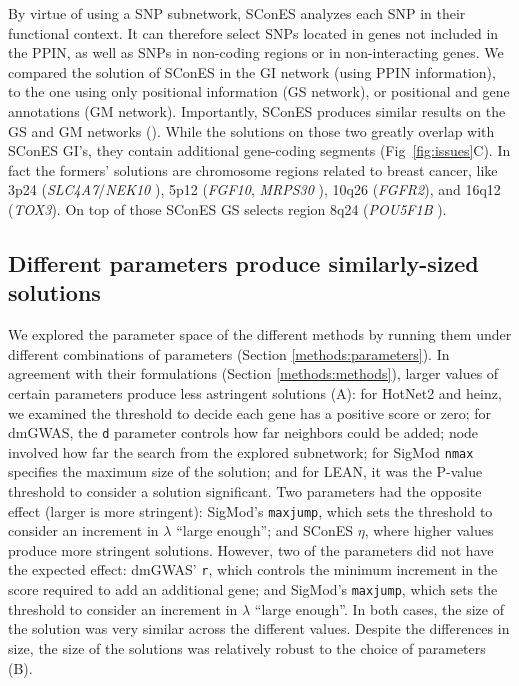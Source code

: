 \documentclass[10pt,letterpaper]{article}
\begin{document}
By virtue of using a SNP subnetwork, SConES analyzes each SNP in their functional context. It can therefore select SNPs located in genes not included in the PPIN, as well as SNPs in non-coding regions or in non-interacting genes. We compared the solution of SConES in the GI network (using PPIN information), to the one using only positional information (GS network), or positional and gene annotations (GM network). Importantly, SConES produces similar results on the GS and GM networks (). While the solutions on those two greatly overlap with SConES GI's, they contain additional gene-coding segments (Fig~\ref{fig:issues}C). In fact the formers' solutions are chromosome regions related to breast cancer, like 3p24 (\emph{SLC4A7}/\emph{NEK10} \cite{ahmed_newly_2009}), 5p12 (\emph{FGF10}, \emph{MRPS30} \cite{quigley_5p12_2014}), 10q26 (\emph{FGFR2}), and 16q12 (\emph{TOX3}). On top of those SConES GS selects region 8q24 (\emph{POU5F1B} \cite{breyer_expressed_2014}). 

\subsection{Different parameters produce similarly-sized solutions}
\label{results:parameters}

We explored the parameter space of the different methods by running them under different combinations of parameters (Section \ref{methods:parameters}). In agreement with their formulations (Section \ref{methods:methods}), larger values of certain parameters produce less astringent solutions (A): for HotNet2 and heinz, we examined the threshold to decide each gene has a positive score or zero; for dmGWAS, the \texttt{d} parameter controls how far neighbors could be added; node involved how far the search from the explored subnetwork; for SigMod \texttt{nmax} specifies the maximum size of the solution; and for LEAN, it was the P-value threshold to consider a solution significant. Two parameters had the opposite effect (larger is more stringent): SigMod's \texttt{maxjump}, which sets the threshold to consider an increment in $\lambda$ ``large enough''; and SConES $\eta$, where higher values produce more stringent solutions. However, two of the parameters did not have the expected effect: dmGWAS' \texttt{r}, which controls the minimum increment in the score required to add an additional gene; and SigMod's \texttt{maxjump}, which sets the threshold to consider an increment in $\lambda$ ``large enough''. In both cases, the size of the solution was very similar across the different values. Despite the differences in size, the size of the solutions was relatively robust to the choice of parameters (B).
\end{document}
